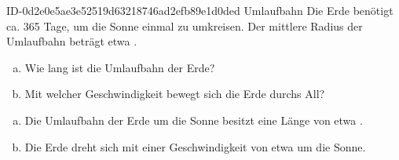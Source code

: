 \begin{exercise}
      {ID-0d2e0e5ae3e52519d63218746ad2efb89e1d0ded}
      {Umlaufbahn}
  \ifproblem\problem
    Die Erde benötigt ca. \num{365} Tage, um die Sonne einmal zu umkreisen.
    Der mittlere Radius der Umlaufbahn beträgt etwa .
    \begin{enumerate}[a)]
      \item Wie lang ist die Umlaufbahn der Erde?
      \item Mit welcher Geschwindigkeit bewegt sich die Erde durchs All?
    \end{enumerate}
  \fi
  \ifoutcome\outcome
    \begin{enumerate}[a)]
      \item Die Umlaufbahn der Erde um die Sonne besitzt eine
            Länge von etwa .
      \item Die Erde dreht sich mit einer Geschwindigkeit von
            etwa  um die Sonne.
    \end{enumerate}
  \fi
\end{exercise}
